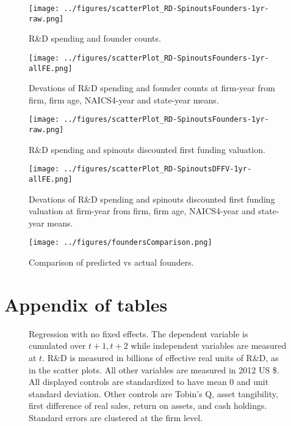 \documentclass[11pt,english]{article}
\theoremstyle{remark}
\begin{document}
\begin{figure}[p]
	\centering
	\texttt{[image: ../figures/scatterPlot\_RD-SpinoutsFounders-1yr-raw.png]}
	\caption{R\&D spending and founder counts.}
	\label{scatter_rd_foundercounts}
\end{figure}

\begin{figure}[p]
	\centering
	\texttt{[image: ../figures/scatterPlot\_RD-SpinoutsFounders-1yr-allFE.png]}
	\caption{Devations of R\&D spending and founder counts at firm-year from firm, firm age, NAICS4-year and state-year means.}
	\label{scatter_rd_foundercounts_d}
\end{figure}


\begin{figure}[p]
	\centering
	\texttt{[image: ../figures/scatterPlot\_RD-SpinoutsFounders-1yr-raw.png]}
	\caption{R\&D spending and spinouts discounted first funding valuation.}
	\label{scatter_rd_dffv}
\end{figure}


\begin{figure}[p]
	\centering
	\texttt{[image: ../figures/scatterPlot\_RD-SpinoutsDFFV-1yr-allFE.png]}
	\caption{Devations of R\&D spending and spinouts discounted first funding valuation at firm-year from firm, firm age, NAICS4-year and state-year means.}
	\label{scatter_rd_dffv_d}
\end{figure}

\begin{figure}[p]
	\centering
	\texttt{[image: ../figures/foundersComparison.png]}
	\caption{Comparison of predicted vs actual founders.}
	\label{foundersComparison}
\end{figure}

\break
\section{Appendix of tables}

\renewcommand\thefigure{\thesection.\arabic{figure}}  
\setcounter{figure}{0}

\begin{figure}[p]
	\centering
	
	\caption{Regression with no fixed effects. The dependent variable is cumulated over $t+1,t+2$ while independent variables are measured at $t$. R\&D is measured in billions of effective real units of R\&D, as in the scatter plots. All other variables are measured in 2012 US \$. All displayed controls are standardized to have mean 0 and unit standard deviation. Other controls are Tobin's Q, asset tangibility, first difference of real sales, return on assets, and cash holdings. Standard errors are clustered at the firm level.}
	\label{regs_allSpinouts_nofe}
\end{figure}
\end{document}
